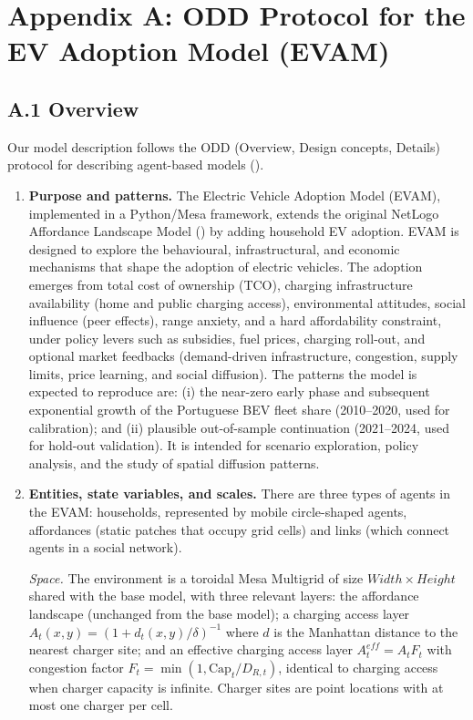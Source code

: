 \documentclass[11pt]{article}
\begin{document}
\appendix
\section*{Appendix A: ODD Protocol for the EV Adoption Model (EVAM)}

\subsection*{A.1 Overview}

Our model description follows the ODD (Overview, Design concepts, Details)
protocol for describing agent-based models
(\cite{grimm2006,grimm2010,grimm2020}).

\begin{enumerate}
\item \textbf{Purpose and patterns.} The Electric Vehicle Adoption Model
  (EVAM), implemented in a Python/Mesa framework, extends the original
  NetLogo Affordance Landscape Model (\cite{kaaronen2020}) by adding
  household EV adoption. EVAM is designed to explore the behavioural,
  infrastructural, and economic mechanisms that shape the adoption of
  electric vehicles. The adoption emerges from total cost of ownership
  (TCO), charging infrastructure availability (home and public charging
  access), environmental attitudes, social influence (peer effects), range
  anxiety, and a hard affordability constraint, under policy levers such as
  subsidies, fuel prices, charging roll-out, and optional market feedbacks
  (demand-driven infrastructure, congestion, supply limits, price learning,
  and social diffusion). The patterns the model is expected to reproduce
  are: (i) the near-zero early phase and subsequent exponential growth of
  the Portuguese BEV fleet share (2010--2020, used for calibration); and
  (ii) plausible out-of-sample continuation (2021--2024, used for hold-out
  validation). It is intended for scenario exploration, policy analysis,
  and the study of spatial diffusion patterns.

\item \textbf{Entities, state variables, and scales.} There are three types
  of agents in the EVAM: households, represented by mobile circle-shaped
  agents, affordances (static patches that occupy grid cells) and links
  (which connect agents in a social network).

  \emph{Space.} The environment is a toroidal Mesa Multigrid of size
  $Width\times Height$ shared with the base model, with three relevant
  layers: the affordance landscape (unchanged from the base model); a
  charging access layer $A_t(x,y)=(1+d_t(x,y)/\delta)^{-1}$ where $d$ is
  the Manhattan distance to the nearest charger site; and an effective
  charging access layer $A^{e\!f\!f}_t = A_t F_t$ with congestion factor
  $F_t=\min(1,\mathrm{Cap}_t/D_{R,t})$, identical to charging access when
  charger capacity is infinite. Charger sites are point locations with at
  most one charger per cell.


\end{enumerate}
\end{document}
